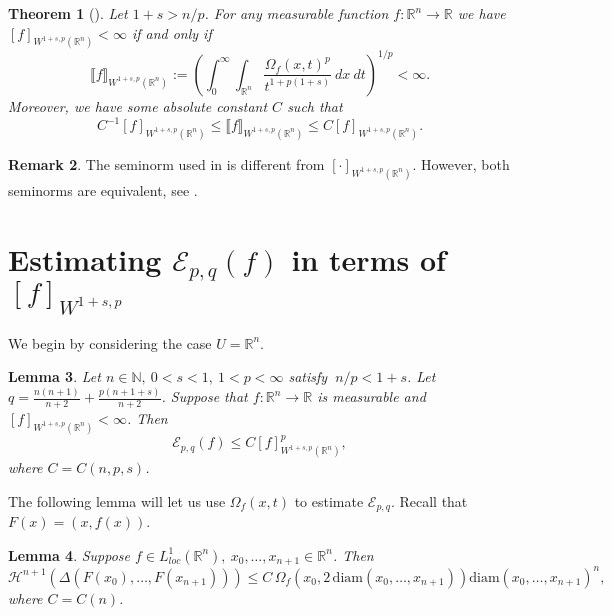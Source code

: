 \documentclass[11pt]{amsart}
\newcommand{\R}{\mathbb{R}}
\renewcommand{\H}{\mathscr{H}}
\newcommand{\diam}{\mathrm{diam}}
\newcommand{\Epq}{\mathcal{E}_{p,q}}
\newtheorem{theorem}{Theorem}[section]
\newtheorem{lemma}[theorem]{Lemma}
\theoremstyle{definition}
\newtheorem{remark}[theorem]{Remark}
\newtheorem{defi}[theorem]{Definition}
\begin{document}
	\begin{theorem}[{\cite[Theorem 2]{dorronsoro1985mean}}]\label{thm:dorronsoro}
		Let $1+s>n/p$. For any measurable function $f:\R^n\rightarrow\R$ we have $[f]_{W^{1+s,p}(\R^n)}<\infty$ if and only if
		\begin{equation*}
		\llbracket f\rrbracket_{W^{1+s,p}(\R^n)}:=\left(\int_0^{\infty}\int_{\R^n}\frac{\Omega_f(x,t)^p}{t^{1+p(1+s)}}\ dx\ dt\right)^{1/p}<\infty.
		\end{equation*}
		Moreover, we have some absolute constant $C$ such that
		\begin{equation*} 
		C^{-1}[f]_{W^{1+s,p}(\R^n)}\le \llbracket f\rrbracket_{W^{1+s,p}(\R^n)}\le C [f]_{W^{1+s,p}(\R^n)}.
		\end{equation*}
	\end{theorem}
	\begin{remark}
		The seminorm used in \cite{dorronsoro1985mean} is different from $[\cdot]_{W^{1+s,p}(\R^n)}$. However, both seminorms are equivalent, see \cite[5.2.3/Theorem 2]{triebel}.
	\end{remark}

\section{Estimating $\Epq(f)$ in terms of $[f]_{W^{1+s,p}}$}
We begin by considering the case $U=\R^n$.
	\begin{lemma}\label{thm:sobolev_implies_energy}
		Let $n\in\mathbb{N},\ 0<s<1,\ 1<p<\infty$ satisfy $\ n/p<1+s$. Let $q=\frac{n(n+1)}{n+2} + \frac{p(n+1+s)}{n+2}$. Suppose that $f:\R^n\rightarrow\R$ is measurable and $[f]_{W^{1+s,p}(\R^n)}<\infty$. Then 
		\begin{equation*} 
		\mathcal{E}_{p,q}(f)\le C [f]_{W^{1+s,p}(\R^n)}^p,
		\end{equation*}
		where $C=C(n,p,s)$.
	\end{lemma}
	
%	
	The following lemma will let us use $\Omega_f(x,t)$ to estimate $\Epq$. Recall that $F(x)=(x,f(x))$.
	\begin{lemma}\label{lem:beta_est}
		Suppose $f\in L^1_{loc}(\R^n),\ x_0,\dots,x_{n+1}\in\R^n$. Then
		\begin{equation*}\label{eq:beta_est}
		\H^{n+1}(\Delta(F(x_0),\dots,F(x_{n+1})))\leq C\, \Omega_f(x_0,2\,\diam(x_0,\dots,x_{n+1}))\diam(x_0,\dots,x_{n+1})^n,
		\end{equation*}
		where $C=C(n)$.
	\end{lemma}
	
\end{document}

